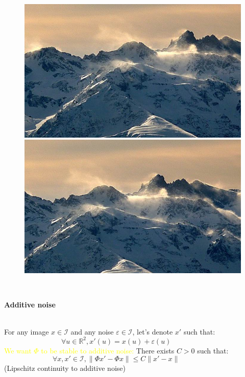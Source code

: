 \documentclass[10pt]{beamer}
\newcommand{\mathR}{\mathbb{R}}
\newcommand{\MI}{{\mathcal I}}
\newcommand{\col}{\textcolor{yellow}}
\begin{document}
\begin{darkframes}
\begin{frame}[label=transl]{\subsecname}
\begin{columns}
        \begin{figure}
        \centering
        \includegraphics[height=0.3\textheight]{resources/25639-9_1.jpg}
        \vspace{0.01\textheight}
        \includegraphics[height=0.3\textheight]{resources/25639-9_2.jpg}
        \end{figure}
        
    \end{columns}
    
    \end{frame}
    
    
    \begin{frame}[label=noise]{\subsecname}
    \framesubtitle{Additive noise}
    
    \begin{columns}
    
        For any image $x \in \MI$ and any noise $\varepsilon \in \MI$, let's denote $x'$ such that:
        $$\forall u \in \mathR^2, x'(u) = x(u) + \varepsilon(u)$$
        \col{We want $\Phi$ to be stable to additive noise:} There exists $C > 0$ such that:
        $$\forall x, x' \in \MI, \|\Phi x' - \Phi x\| \leq C \|x'-x\|$$
        (Lipschitz continuity to additive noise)
        

\end{columns}
\end{frame}
\end{darkframes}
\end{document}
